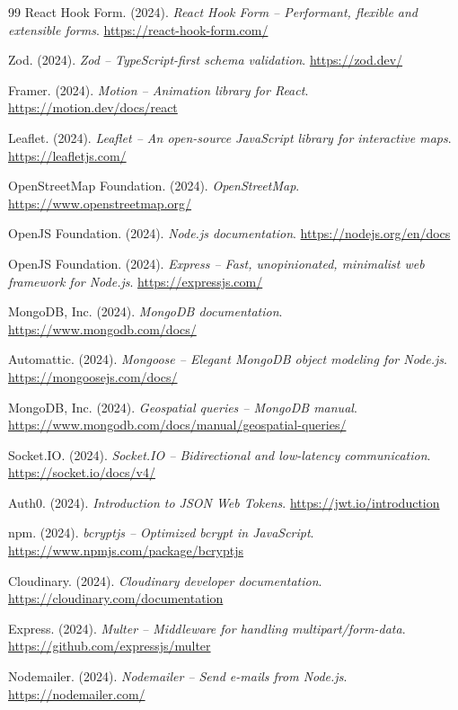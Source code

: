 \begin{thebibliography}{99}
React Hook Form. (2024). \textit{React Hook Form -- Performant, flexible and extensible forms}. \url{https://react-hook-form.com/}

Zod. (2024). \textit{Zod -- TypeScript-first schema validation}. \url{https://zod.dev/}

Framer. (2024). \textit{Motion -- Animation library for React}. \url{https://motion.dev/docs/react}

Leaflet. (2024). \textit{Leaflet -- An open-source JavaScript library for interactive maps}. \url{https://leafletjs.com/}

OpenStreetMap Foundation. (2024). \textit{OpenStreetMap}. \url{https://www.openstreetmap.org/}

OpenJS Foundation. (2024). \textit{Node.js documentation}. \url{https://nodejs.org/en/docs}

OpenJS Foundation. (2024). \textit{Express -- Fast, unopinionated, minimalist web framework for Node.js}. \url{https://expressjs.com/}

MongoDB, Inc. (2024). \textit{MongoDB documentation}. \url{https://www.mongodb.com/docs/}

Automattic. (2024). \textit{Mongoose -- Elegant MongoDB object modeling for Node.js}. \url{https://mongoosejs.com/docs/}

MongoDB, Inc. (2024). \textit{Geospatial queries -- MongoDB manual}. \url{https://www.mongodb.com/docs/manual/geospatial-queries/}

Socket.IO. (2024). \textit{Socket.IO -- Bidirectional and low-latency communication}. \url{https://socket.io/docs/v4/}

Auth0. (2024). \textit{Introduction to JSON Web Tokens}. \url{https://jwt.io/introduction}

npm. (2024). \textit{bcryptjs -- Optimized bcrypt in JavaScript}. \url{https://www.npmjs.com/package/bcryptjs}

Cloudinary. (2024). \textit{Cloudinary developer documentation}. \url{https://cloudinary.com/documentation}

Express. (2024). \textit{Multer -- Middleware for handling multipart/form-data}. \url{https://github.com/expressjs/multer}

Nodemailer. (2024). \textit{Nodemailer -- Send e-mails from Node.js}. \url{https://nodemailer.com/}


\end{thebibliography}
